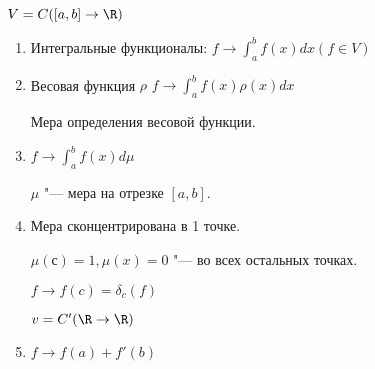 \begin{exmp}
$V = C([a, b] \to \R)$

\begin{enumerate}
\item Интегральные функционалы:
$f \to \int_a^b f(x) dx (f \in V)$
\item Весовая функция $\rho$
$f \to \int_{a}^{b}f(x)\rho(x)dx$

Мера определения весовой функции.
\item $f \to \int_a^{b}f(x) d \mu$ 

$\mu$ "--- мера на отрезке $[a, b]$.

\item  Мера сконцентрирована в 1 точке.

$\mu(с) = 1, \mu(x) = 0$ "--- во всех остальных точках.

$f \to f(c) = \delta_c(f)$

$v = C'(\R \to \R)$
\item $f \to f(a) + f'(b)$
\end{enumerate}
\end{exmp}